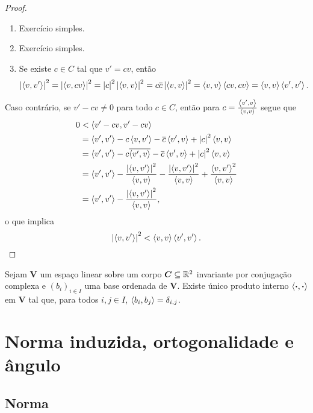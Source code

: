 \begin{proof}
	\begin{enumerate}
	\item Exercício simples.
	\item Exercício simples.
	\item Se existe $c \in C$ tal que $v'=cv$, então
		\begin{equation*}
		\abs{\inte{v}{v'}}^2 =\abs{\inte{v}{cv}}^2 = \abs{c}^2\abs{\inte{v}{v}}^2 = c\conju{c}\abs{\inte{v}{v}}^2 = \inte{v}{v}\inte{cv}{cv} = \inte{v}{v}\inte{v'}{v'}.
		\end{equation*}
	\end{enumerate}

Caso contrário, se $v'-cv \neq 0$ para todo $c \in C$, então para $c=\frac{\inte{v'}{v}}{\inte{v}{v}}$ segue que
	\begin{align*}
	0 &< \inte{v'-cv}{v'-cv} \\
		&= \inte{v'}{v'} - c\inte{v}{v'} - \conju{c}\inte{v'}{v} + \abs{c}^2\inte{v}{v} \\
		&= \inte{v'}{v'} - c\conju{\inte{v'}{v}} - \conju{c}\inte{v'}{v} + \abs{c}^2\inte{v}{v} \\
		&= \inte{v'}{v'} - \frac{\abs{\inte{v}{v'}}^2}{\inte{v}{v}} - \frac{\abs{\inte{v}{v'}}^2}{\inte{v}{v}} + \frac{\inte{v}{v'}^2}{\inte{v}{v}} \\
		&=  \inte{v'}{v'} - \frac{\abs{\inte{v}{v'}}^2}{\inte{v}{v}},
	\end{align*}
o que implica
	\begin{equation*}
	\abs{\inte{v}{v'}}^2 < \inte{v}{v}\inte{v'}{v'}.
	\end{equation*}
\end{proof}

\begin{proposition}
Sejam $\bm V$ um espaço linear sobre um corpo $\bm C \subseteq \R^2$ invariante por conjugação complexa e $(b_i)_{i \in I}$ uma base ordenada de $\bm V$. Existe único produto interno $\inte{\var}{\var}$ em $\bm V$ tal que, para todos $i,j \in I$, $\inte{b_i}{b_j}=\delta_{i,j}$.
\end{proposition}

\section{Norma induzida, ortogonalidade e ângulo}

\subsection{Norma}

